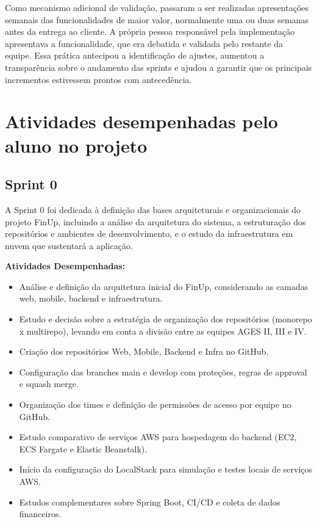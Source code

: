 Como mecanismo adicional de validação, passaram a ser realizadas apresentações
semanais das funcionalidades de maior valor, normalmente uma ou duas semanas
antes da entrega ao cliente. A própria pessoa responsável pela implementação
apresentava a funcionalidade, que era debatida e validada pelo restante da
equipe. Essa prática antecipou a identificação de ajustes, aumentou a
transparência sobre o andamento das sprints e ajudou a garantir que os principais
incrementos estivessem prontos com antecedência.

\section{Atividades desempenhadas pelo aluno no projeto}

\subsection{Sprint 0}

A Sprint 0 foi dedicada à definição das bases arquiteturais e
organizacionais do projeto FinUp, incluindo a análise da arquitetura do
sistema, a estruturação dos repositórios e ambientes de desenvolvimento,
e o estudo da infraestrutura em nuvem que sustentará a aplicação.

\textbf{Atividades Desempenhadas:}

\begin{itemize}
\item
  Análise e definição da arquitetura inicial do FinUp, considerando as
  camadas web, mobile, backend e infraestrutura.
\item
  Estudo e decisão sobre a estratégia de organização dos repositórios
  (monorepo x multirepo), levando em conta a divisão entre as equipes
  AGES II, III e IV.
\item
  Criação dos repositórios Web, Mobile, Backend e Infra no GitHub.
\item
  Configuração das branches main e develop com proteções, regras de
  approval e squash merge.
\item
  Organização dos times e definição de permissões de acesso por equipe
  no GitHub.
\item
  Estudo comparativo de serviços AWS para hospedagem do backend (EC2,
  ECS Fargate e Elastic Beanstalk).
\item
  Início da configuração do LocalStack para simulação e testes locais de
  serviços AWS.
\item
  Estudos complementares sobre Spring Boot, CI/CD e coleta de dados
  financeiros.
\end{itemize}

